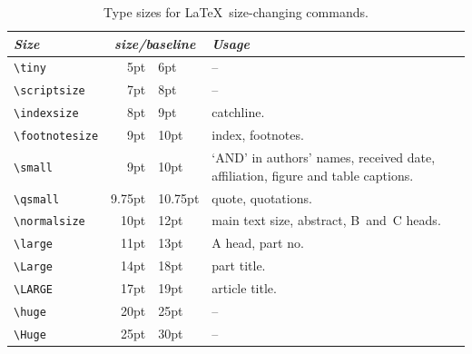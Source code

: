 \begin{table}
 \begin{tabular}{lr@{/}lp{4cm}}
 \multicolumn{1}{l}{\it Size} &
  \multicolumn{2}{c}{\it size/baseline} & \it Usage\\
 \hline
 \verb"\tiny"         &     5pt &  6pt    & -- \\
 \verb"\scriptsize"   &     7pt &  8pt    & -- \\
 \verb"\indexsize"    &     8pt &  9pt    & catchline. \\
 \verb"\footnotesize" &     9pt & 10pt    & index, footnotes. \\
 \verb"\small"        &     9pt & 10pt    & `AND' in authors' names,
                                            received date, affiliation,
                                            figure and table captions. \\
 \verb"\qsmall"       &  9.75pt & 10.75pt & quote, quotations. \\
 \verb"\normalsize"   &    10pt & 12pt    & main text size, abstract,
                                            B~and~C heads. \\
 \verb"\large"        &    11pt & 13pt    & A head, part no. \\
 \verb"\Large"        &    14pt & 18pt    & part title. \\
 \verb"\LARGE"        &    17pt & 19pt    & article title. \\
 \verb"\huge"         &    20pt & 25pt    & -- \\
 \verb"\Huge"         &    25pt & 30pt    & -- \\
 \end{tabular}
\caption{Type sizes for \LaTeX\ size-changing commands.}
\label{tab:fontsizes}
\end{table}


\label{lastpage}


